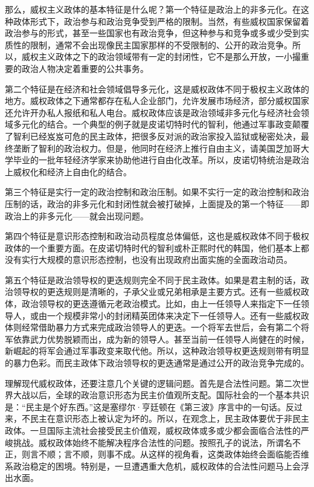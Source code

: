 那么，威权主义政体的基本特征是什么呢？第一个特征是政治上的非多元化。在这种政体形式下，政治参与和政治竞争受到严格的限制。当然，有些威权国家保留着政治参与的形式，甚至一些国家也有政治竞争，但这种参与和竞争或多或少受到实质性的限制，通常不会出现像民主国家那样的不受限制的、公开的政治竞争。所以，威权主义政体之下的政治领域带有一定的封闭性，它不是那么开放，一小撮重要的政治人物决定着重要的公共事务。

第二个特征是在经济和社会领域倡导多元化，这是威权政体不同于极权主义政体的地方。威权政体之下通常都存在私人企业部门，允许发展市场经济，部分威权国家还允许开办私人报纸和私人电台。威权政体应该是政治领域非多元化与经济社会领域多元化的结合。一个典型的例子就是皮诺切特时代的智利，他通过军事政变颠覆了智利已经岌岌可危的民主政体，把很多反对派的政治家投入监狱或秘密处决，最终垄断了智利的政治权力。但是，他同时在经济上推行自由主义，请美国芝加哥大学毕业的一批年轻经济学家来协助他进行自由化改革。所以，皮诺切特统治是政治上威权化和经济上自由化的结合。

第三个特征是实行一定的政治控制和政治压制。如果不实行一定的政治控制和政治压制的话，政治的非多元化和封闭性就会被打破掉，上面提及的第一个特征——即政治上的非多元化——就会出现问题。

第四个特征是意识形态控制和政治动员程度总体偏低，这也是威权政体不同于极权政体的一个重要方面。在皮诺切特时代的智利或朴正熙时代的韩国，他们基本上都没有实行大规模的意识形态控制，也没有出现政府出面实施的全面政治动员。

第五个特征是政治领导权的更迭规则完全不同于民主政体。如果是君主制的话，政治领导权的更迭规则是清晰的，子承父业或兄弟相承是主要方式。还有一些威权政体，政治领导权的更迭遵循元老政治模式。比如，由上一任领导人来指定下一任领导人，或由一个规模非常小的封闭精英团体来决定下一任领导人。还有一些威权政体则经常借助暴力方式来完成政治领导人的更迭。一个将军去世后，会有第二个将军依靠武力优势脱颖而出，成为新的领导人。甚至当前一任领导人尚健在的时候，新崛起的将军会通过军事政变来取代他。所以，这种政治领导权更迭规则带有明显的暴力色彩。而民主政体下政治领导权的更迭通常是通过公开的政治竞争完成的。

理解现代威权政体，还要注意几个关键的逻辑问题。首先是合法性问题。第二次世界大战以后，全球的政治意识形态为民主价值观所支配。国际社会的一个基本共识是：“民主是个好东西。”这是塞缪尔·亨廷顿在《第三波》序言中的一句话。反过来，不民主在意识形态上被认定为坏的。所以，在观念上，民主政体要优于非民主政体。一旦国际主流社会接受民主价值观，威权政体或多或少都会面临合法性的严峻挑战。威权政体始终不能解决程序合法性的问题。按照孔子的说法，所谓名不正，则言不顺；言不顺，则事不成。从这样的视角看，这类政体始终会面临能否维系政治稳定的困境。特别是，一旦遭遇重大危机，威权政体的合法性问题马上会浮出水面。

